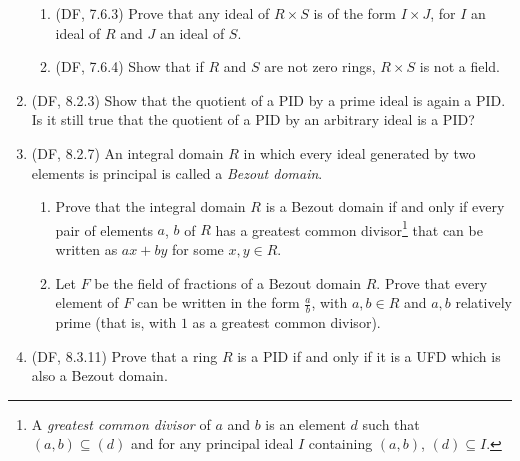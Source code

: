 \documentclass{amsart}
\theoremstyle{definition}
\begin{document}
\begin{enumerate}
  \begin{enumerate}
  \item (DF, 7.6.3) Prove that any ideal of $R \times S$ is of the form $I \times J$, for $I$ an ideal of $R$ and $J$ an ideal of $S$.
  \item (DF, 7.6.4) Show that if $R$ and $S$ are not zero rings, $R \times S$ is not a field.
  \end{enumerate}
\item (DF, 8.2.3) Show that the quotient of a PID by a prime ideal is again a PID. Is it still true that the quotient of a PID by an arbitrary ideal is a PID?
\item (DF, 8.2.7) An integral domain $R$ in which every ideal generated by two elements is principal is called a \emph{Bezout domain}.
  \begin{enumerate}
  \item Prove that the integral domain $R$ is a Bezout domain if and only if every pair of elements $a$, $b$ of $R$ has a greatest common divisor\footnote{A \emph{greatest common divisor} of $a$ and $b$ is an element $d$ such that $(a, b) \subseteq (d)$ and for any principal ideal $I$ containing $(a, b)$, $(d) \subseteq I$.} that can be written as $ax + by$ for some $x, y \in R$.
  \item Let $F$ be the field of fractions of a Bezout domain $R$. Prove that every element of $F$ can be written in the form $\frac{a}{b}$, with $a, b \in R$ and $a, b$ relatively prime (that is, with $1$ as a greatest common divisor).
  \end{enumerate}
\item (DF, 8.3.11) Prove that a ring $R$ is a PID if and only if it is a UFD which is also a Bezout domain.
\end{enumerate}
\end{document}
